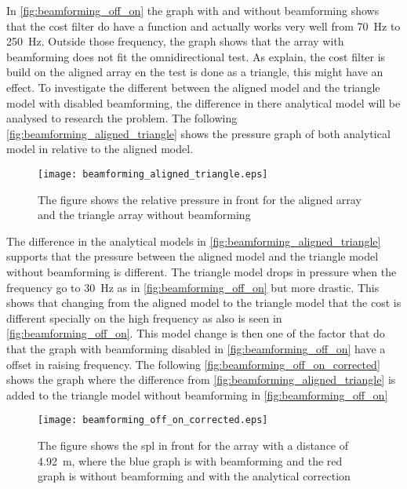 In \autoref{fig:beamforming_off_on} the graph with and without beamforming shows that the cost filter do have a function and actually works very well from \SI{70}{\hertz} to \SI{250}{\hertz}. Outside those frequency, the graph shows that the array with beamforming does not fit the omnidirectional test. As explain, the cost filter is build on the aligned array en the test is done as a triangle, this might have an effect. To investigate the different between the aligned model and the triangle model with disabled beamforming, the difference in there analytical model will be analysed to research the problem. The following \autoref{fig:beamforming_aligned_triangle} shows the pressure graph of both analytical model in relative to the aligned model.

  \begin{figure}[H]
	\centering
	\texttt{[image: beamforming\_aligned\_triangle.eps]}
	\caption{The figure shows the relative pressure in front for the aligned array and the triangle array without beamforming}
		\label{fig:beamforming_aligned_triangle}
\end{figure}

The difference in the analytical models in \autoref{fig:beamforming_aligned_triangle} supports that the pressure between the aligned model and the triangle model without beamforming is different. The triangle model drops in pressure when the frequency go to \SI{30}{\hertz} as in \autoref{fig:beamforming_off_on} but more drastic. This shows that changing from the aligned model to the triangle model that the cost is different specially on the high frequency as also is seen in \autoref{fig:beamforming_off_on}. This model change is then one of the factor that do that the graph with beamforming disabled in \autoref{fig:beamforming_off_on} have a offset in raising frequency. The following \autoref{fig:beamforming_off_on_corrected} shows the graph where the difference from \autoref{fig:beamforming_aligned_triangle} is added to the triangle model without beamforming in  \autoref{fig:beamforming_off_on}

  \begin{figure}[H]
	\centering
	\texttt{[image: beamforming\_off\_on\_corrected.eps]}
	\caption{The figure shows the \gls{spl} in front for the array with a distance of \SI{4.92}{\meter}, where the blue graph is with beamforming and the red graph is without beamforming and with the analytical correction}
		\label{fig:beamforming_off_on_corrected}
\end{figure}


